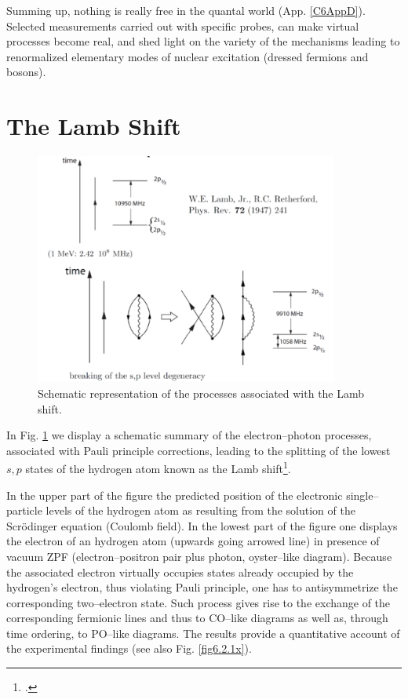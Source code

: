  Summing up, nothing is really free in the quantal world (App. \ref{C6AppD}). Selected measurements carried out with specific probes, can make virtual processes become real, and shed light on the variety of the mechanisms leading to renormalized elementary modes of nuclear excitation (dressed fermions and bosons).
\section{The Lamb Shift}\label{C6AppC}
 \begin{figure}
\centerline{\includegraphics*[width=10cm,angle=0]{C6/figs_C6/fig6_C3}}
\caption{Schematic representation of the processes associated with the Lamb shift.}\label{fig6_C1}
\end{figure}
In Fig. \ref{fig6_C1} we display a schematic summary of the electron--photon processes, associated with Pauli principle corrections, leading to the splitting of the lowest $s,p$ states of the hydrogen atom known as the Lamb shift\footnote{\cite{Lamb:47,Kroll:49}.}.


In the upper part of the figure the predicted position of the electronic single--particle levels of the hydrogen atom as resulting from the solution of the Scr\"{o}dinger equation (Coulomb field). In the lowest part of the figure one displays the electron of an hydrogen atom (upwards going arrowed line) in presence of vacuum ZPF (electron--positron pair plus photon, oyster--like diagram).  Because the associated electron virtually occupies states already occupied by the hydrogen's electron, thus violating Pauli principle, one has to antisymmetrize the corresponding two--electron state. Such process gives rise to the exchange of the corresponding fermionic lines and thus to CO--like diagrams as well as, through time ordering, to PO--like diagrams. The results provide a quantitative account of the experimental findings (see also Fig. \ref{fig6.2.1x}).  
